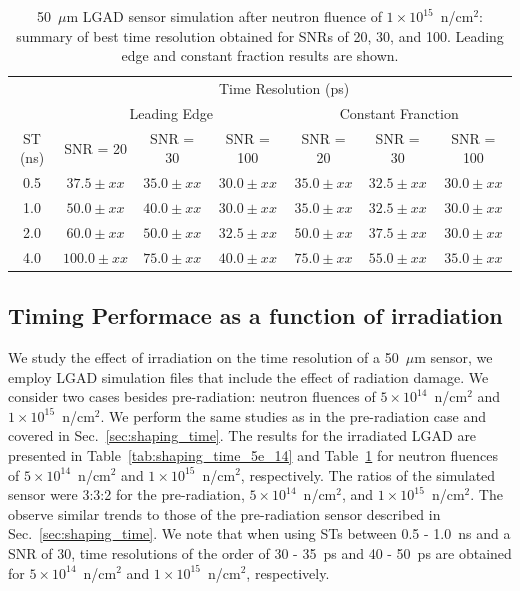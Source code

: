 \documentclass[preprint,1p]{elsarticle}
\begin{document}
  \begin{table}\label{tab:shaping_time_1e_15}
      \begin{tabular}{c|ccc|ccc}
      \multicolumn{1}{c}{}& \multicolumn{6}{c}{Time Resolution (ps)} \\
      \multicolumn{1}{c}{}&\multicolumn{3}{c}{Leading Edge} & \multicolumn{3}{c}{Constant Franction}\\ \hline
      ST (ns) & SNR = 20   & SNR = 30      & SNR = 100     & SNR = 20      & SNR = 30      & SNR = 100 \\
      0.5 & $37.5 \pm xx$  & $35.0 \pm xx$ & $30.0 \pm xx$ & $35.0 \pm xx$ & $32.5 \pm xx$ & $30.0 \pm xx$\\
      1.0 & $50.0 \pm xx$  & $40.0 \pm xx$ & $30.0 \pm xx$ & $35.0 \pm xx$ & $32.5 \pm xx$ & $30.0 \pm xx$\\
      2.0 & $60.0 \pm xx$  & $50.0 \pm xx$ & $32.5 \pm xx$ & $50.0 \pm xx$ & $37.5 \pm xx$ & $30.0 \pm xx$\\
      4.0 & $100.0 \pm xx$ & $75.0 \pm xx$ & $40.0 \pm xx$ & $75.0 \pm xx$ & $55.0 \pm xx$ & $35.0 \pm xx$\\
      \end{tabular}
      \caption{50~$\mu$m LGAD sensor simulation after neutron fluence of
       $1\times 10^{15}$~n/cm$^2$: summary of best time resolution obtained for SNRs
      of 20, 30, and 100. Leading edge and constant fraction results are shown.}
   \end{table}

\subsection{Timing Performace as a function of irradiation}\label{sec:rad_tolerance}
We study the effect of irradiation on the time resolution of a 50~$\mu$m sensor, we employ LGAD simulation files that include
the effect of radiation damage. We consider two cases besides pre-radiation: neutron fluences of
 $5\times 10^{14}$~n/cm$^2$ and $1\times 10^{15}$~n/cm$^2$. We perform the same studies as in the pre-radiation case and covered in
 Sec.~\ref{sec:shaping_time}. The results for the irradiated LGAD are presented in Table~\ref{tab:shaping_time_5e_14} and
 Table~\ref{tab:shaping_time_1e_15}  for neutron fluences of
  $5\times 10^{14}$~n/cm$^2$ and $1\times 10^{15}$~n/cm$^2$, respectively. The ratios of the simulated sensor were 3:3:2 for the pre-radiation,
   $5\times 10^{14}$~n/cm$^2$, and $1\times 10^{15}$~n/cm$^2$. The observe similar trends to those of the pre-radiation sensor described in
   Sec.~\ref{sec:shaping_time}. We note that when using STs between 0.5 - 1.0~\si{ns} and a SNR of 30, time resolutions of the order
   of 30 - 35~\si{ps} and 40 - 50~\si{ps} are obtained for $5\times 10^{14}$~n/cm$^2$ and $1\times 10^{15}$~n/cm$^2$, respectively.
\end{document}
